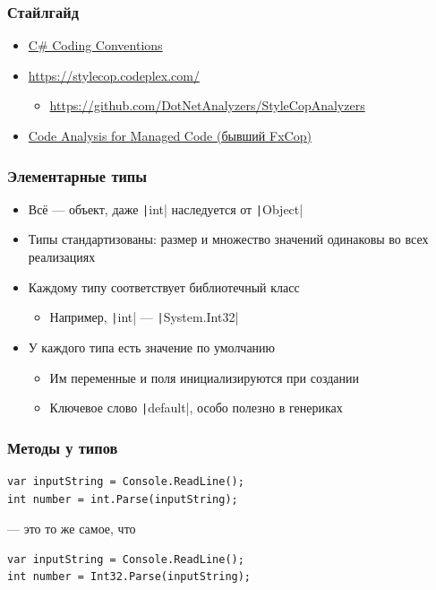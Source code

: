 \documentclass[xetex,mathserif,serif]{beamer}
\begin{document}
	\begin{frame}
		\frametitle{Стайлгайд}
		\begin{itemize}
			\item \href{https://msdn.microsoft.com/en-us/library/ff926074.aspx}{C\# Coding Conventions}
			\item \href{https://stylecop.codeplex.com/}{https://stylecop.codeplex.com/}
			\begin{itemize}
				\item \href{https://github.com/DotNetAnalyzers/StyleCopAnalyzers}{https://github.com/DotNetAnalyzers/StyleCopAnalyzers}
			\end{itemize}
			\item \href{https://msdn.microsoft.com/en-us/library/3z0aeatx.aspx}{Code Analysis for Managed Code (бывший FxCop)}
		\end{itemize}
	\end{frame}

	\begin{frame}
		\frametitle{Элементарные типы}
		\begin{itemize}
			\item Всё --- объект, даже \texttt|int| наследуется от \texttt|Object|
			\item Типы стандартизованы: размер и множество значений одинаковы во всех реализациях
			\item Каждому типу соответствует библиотечный класс
			\begin{itemize}
				\item Например, \texttt|int| --- \texttt|System.Int32|
			\end{itemize}
			\item У каждого типа есть значение по умолчанию
			\begin{itemize}
				\item Им переменные и поля инициализируются при создании
				\item Ключевое слово \texttt|default|, особо полезно в генериках
			\end{itemize}
		\end{itemize}
	\end{frame}

	\begin{frame}[fragile]
		\frametitle{Методы у типов}
		\begin{verbatim}
var inputString = Console.ReadLine();
int number = int.Parse(inputString);
		\end{verbatim}
		--- это то же самое, что
		\begin{verbatim}
var inputString = Console.ReadLine();
int number = Int32.Parse(inputString);
		\end{verbatim}
\end{frame}
\end{document}
